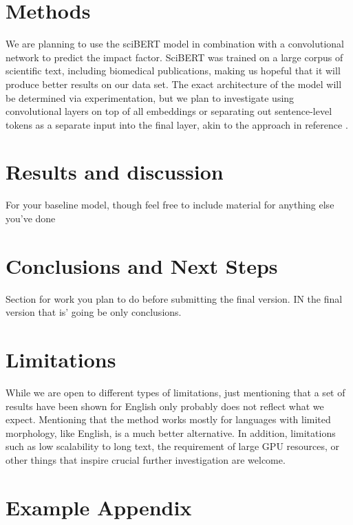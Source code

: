 \documentclass[11pt]{article}
\begin{document}
\section{Methods}
We are planning to use the sciBERT model in combination with a convolutional network to predict the impact factor. SciBERT was trained on a large corpus of scientific text, including biomedical publications, making us hopeful that it will produce better results on our data set. The exact architecture of the model will be determined via experimentation, but we plan to investigate using convolutional layers on top of all embeddings or separating out sentence-level tokens as a separate input into the final layer, akin to the approach in reference \citep{hs2022}.

\section{Results and discussion}
For your baseline model, though feel free to include material for anything else you’ve done

\section{Conclusions and Next Steps}
Section for work you plan to do before submitting the final version. IN the final version that is' going be only conclusions. 

\section*{Limitations}
While we are open to different types of limitations, just mentioning that a set of results have been shown for English only probably does not reflect what we expect. 
Mentioning that the method works mostly for languages with limited morphology, like English, is a much better alternative.
In addition, limitations such as low scalability to long text, the requirement of large GPU resources, or other things that inspire crucial further investigation are welcome.




\appendix

\section{Example Appendix}
\label{sec:appendix}
\end{document}
